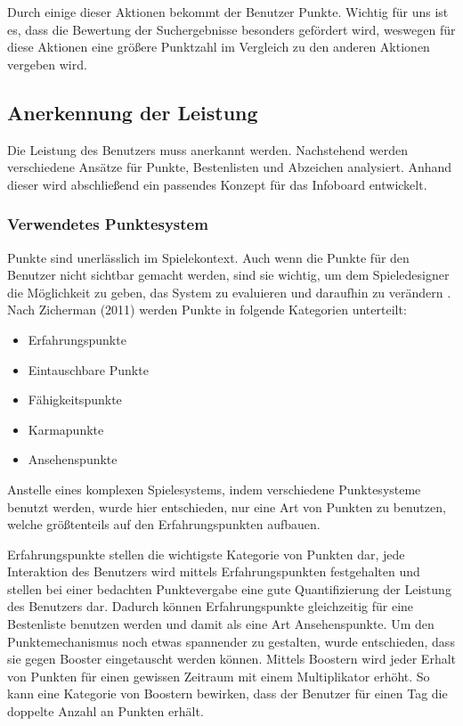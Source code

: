 \documentclass[12pt,twoside]{book}
\begin{document}
Durch einige dieser Aktionen bekommt der Benutzer Punkte. Wichtig für uns ist es, dass die Bewertung der Suchergebnisse besonders gefördert wird, weswegen für diese Aktionen eine größere Punktzahl im Vergleich zu den anderen Aktionen vergeben wird.

\subsection{Anerkennung der Leistung}

Die Leistung des Benutzers muss anerkannt werden. Nachstehend werden verschiedene Ansätze für Punkte, Bestenlisten und Abzeichen analysiert. Anhand dieser wird abschließend ein passendes Konzept für das Infoboard entwickelt.

\subsubsection*{Verwendetes Punktesystem}

Punkte sind unerlässlich im Spielekontext. Auch wenn die Punkte für den Benutzer nicht sichtbar gemacht werden, sind sie wichtig, um dem Spieledesigner die Möglichkeit zu geben, das System zu evaluieren und daraufhin zu verändern \citep[pp. 36]{zichermann2011gamification}. Nach Zicherman (2011) \cite{zichermann2011gamification} werden Punkte in folgende Kategorien unterteilt:

\begin{itemize}
	\item Erfahrungspunkte
    \item Eintauschbare Punkte
    \item Fähigkeitspunkte
    \item Karmapunkte
    \item Ansehenspunkte
\end{itemize}

Anstelle eines komplexen Spielesystems, indem verschiedene Punktesysteme benutzt werden, wurde hier entschieden, nur eine Art von Punkten zu benutzen, welche größtenteils auf den Erfahrungspunkten aufbauen.

Erfahrungspunkte stellen die wichtigste Kategorie von Punkten dar, jede Interaktion des Benutzers wird mittels Erfahrungspunkten festgehalten \citep[38 - 39]{zichermann2011gamification} und stellen bei einer bedachten Punktevergabe  eine gute Quantifizierung der Leistung des Benutzers dar. Dadurch können Erfahrungspunkte gleichzeitig für eine Bestenliste benutzen werden und damit als eine Art Ansehenspunkte. Um den Punktemechanismus noch etwas spannender zu gestalten, wurde entschieden, dass sie gegen Booster eingetauscht werden können. Mittels Boostern wird jeder Erhalt von Punkten für einen gewissen Zeitraum mit einem Multiplikator erhöht. So kann eine Kategorie von Boostern bewirken, dass der Benutzer für einen Tag die doppelte Anzahl an Punkten erhält.
\end{document}
